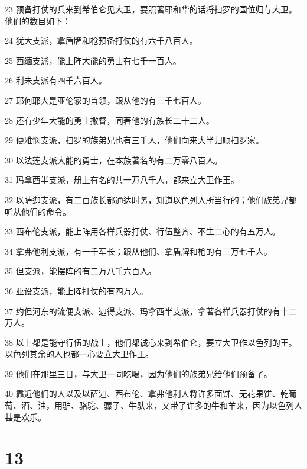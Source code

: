 \par 23 预备打仗的兵来到希伯仑见大卫，要照著耶和华的话将扫罗的国位归与大卫。他们的数目如下：
\par 24 犹大支派，拿盾牌和枪预备打仗的有六千八百人。
\par 25 西缅支派，能上阵大能的勇士有七千一百人。
\par 26 利未支派有四千六百人。
\par 27 耶何耶大是亚伦家的首领，跟从他的有三千七百人。
\par 28 还有少年大能的勇士撒督，同著他的有族长二十二人。
\par 29 便雅悯支派，扫罗的族弟兄也有三千人，他们向来大半归顺扫罗家。
\par 30 以法莲支派大能的勇士，在本族著名的有二万零八百人。
\par 31 玛拿西半支派，册上有名的共一万八千人，都来立大卫作王。
\par 32 以萨迦支派，有二百族长都通达时务，知道以色列人所当行的；他们族弟兄都听从他们的命令。
\par 33 西布伦支派，能上阵用各样兵器打仗、行伍整齐、不生二心的有五万人。
\par 34 拿弗他利支派，有一千军长；跟从他们、拿盾牌和枪的有三万七千人。
\par 35 但支派，能摆阵的有二万八千六百人。
\par 36 亚设支派，能上阵打仗的有四万人。
\par 37 约但河东的流便支派、迦得支派、玛拿西半支派，拿著各样兵器打仗的有十二万人。
\par 38 以上都是能守行伍的战士，他们都诚心来到希伯仑，要立大卫作以色列的王。以色列其余的人也都一心要立大卫作王。
\par 39 他们在那里三日，与大卫一同吃喝，因为他们的族弟兄给他们预备了。
\par 40 靠近他们的人以及以萨迦、西布伦、拿弗他利人将许多面饼、无花果饼、乾葡萄、酒、油，用驴、骆驼、骡子、牛驮来，又带了许多的牛和羊来，因为以色列人甚是欢乐。

\chapter{13}

